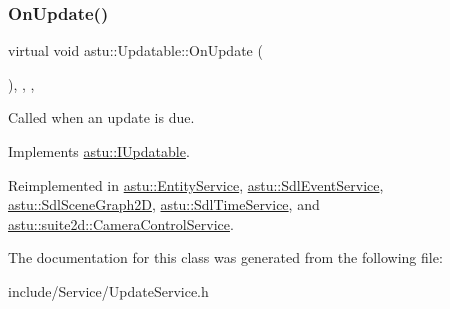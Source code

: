 \subsubsection{\texorpdfstring{On\+Update()}{OnUpdate()}}
{\footnotesize\ttfamily virtual void astu\+::\+Updatable\+::\+On\+Update (\begin{DoxyParamCaption}{ }\end{DoxyParamCaption})\hspace{0.3cm}{\ttfamily [inline]}, {\ttfamily [override]}, {\ttfamily [protected]}, {\ttfamily [virtual]}}

Called when an update is due. 

Implements \hyperlink{classastu_1_1IUpdatable_a76c7c6e2a71b725bbdbdf6808ef4743f}{astu\+::\+I\+Updatable}.



Reimplemented in \hyperlink{classastu_1_1EntityService_a70831a8dc185652c2c9056c4e3cc10e0}{astu\+::\+Entity\+Service}, \hyperlink{classastu_1_1SdlEventService_a67090f42250433506b8bfb4254df9e50}{astu\+::\+Sdl\+Event\+Service}, \hyperlink{classastu_1_1SdlSceneGraph2D_add3a6e67064379389068659addad0920}{astu\+::\+Sdl\+Scene\+Graph2D}, \hyperlink{classastu_1_1SdlTimeService_ada8347f0f665616a2202919e71b76302}{astu\+::\+Sdl\+Time\+Service}, and \hyperlink{classastu_1_1suite2d_1_1CameraControlService_ab547e4f6103448db59d1350695bed4e8}{astu\+::suite2d\+::\+Camera\+Control\+Service}.



The documentation for this class was generated from the following file\+:\begin{DoxyCompactItemize}
\item 
include/\+Service/Update\+Service.\+h\end{DoxyCompactItemize}
